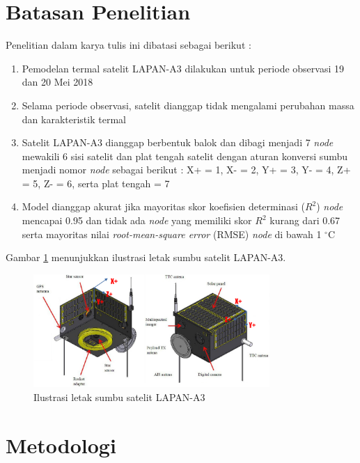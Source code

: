 \section{Batasan Penelitian}

Penelitian dalam karya tulis ini dibatasi sebagai berikut :

\begin{enumerate}
\item Pemodelan termal satelit LAPAN-A3 dilakukan untuk periode observasi 19 dan 20 Mei 2018
\item Selama periode observasi, satelit dianggap tidak mengalami perubahan massa dan karakteristik termal
\item Satelit LAPAN-A3 dianggap berbentuk balok dan dibagi menjadi 7
	\textit{node} mewakili 6 sisi satelit dan plat tengah satelit dengan aturan
		konversi sumbu menjadi nomor \textit{node} sebagai berikut : X+ = 1, X- =
		2, Y+ = 3, Y- = 4, Z+ = 5, Z- = 6, serta plat tengah = 7
	\item Model dianggap akurat jika mayoritas skor koefisien determinasi ($R^2$) \textit{node} mencapai 0.95 dan tidak ada \textit{node} yang memiliki skor $R^2$ kurang dari 0.67 serta mayoritas nilai \textit{root-mean-square error} (RMSE) \textit{node} di bawah 1 $^\circ$C
\end{enumerate}

Gambar \ref{fig:sumbua3} menunjukkan ilustrasi letak sumbu satelit LAPAN-A3.

\begin{figure}[H]
\setlength{}
\begin{center}
\includegraphics[width=0.8\textwidth]{fig/sumbua3.png}
\caption{Ilustrasi letak sumbu satelit LAPAN-A3}
\label{fig:sumbua3}
\end{center}
\end{figure}


\section{Metodologi}

